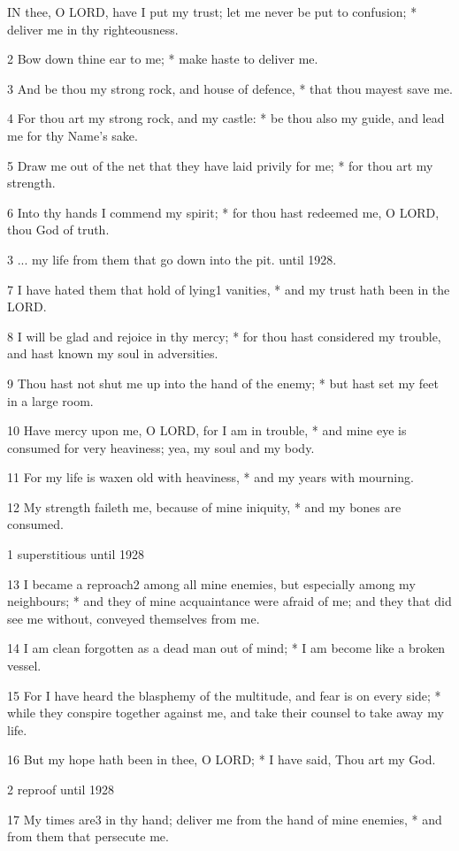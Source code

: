 IN
thee, O LORD, have I put my trust; let me never
be put to confusion; * deliver me in thy righteousness.

2 Bow down thine ear to me; * make haste to deliver
me.

3 And be thou my strong rock, and house of defence,
* that thou mayest save me.

4 For thou art my strong rock, and my castle: * be
thou also my guide, and lead me for thy Name's sake.

5 Draw me out of the net that they have laid privily
for me; * for thou art my strength.

6 Into thy hands I commend my spirit; * for thou hast
redeemed me, O LORD, thou God of truth.

3 ... my life from them that
go down into the pit. until
1928.

7 I have hated them that hold of lying1 vanities, * and
my trust hath been in the LORD.

8 I will be glad and rejoice in thy mercy; * for thou
hast considered my trouble, and hast known my soul in adversities.

9 Thou hast not shut me up into the hand of the enemy;
* but hast set my feet in a large room.

10 Have mercy upon me, O LORD,
for I am in trouble, * and mine eye is consumed for very heaviness; yea,
my soul and my body.

11 For my life is waxen old with heaviness, * and my
years with mourning.

12 My strength faileth me, because of mine iniquity,
* and my bones are consumed.

1 superstitious until
1928

13 I became a reproach2 among all mine enemies,
but especially among my neighbours; * and they of mine acquaintance were
afraid of me; and they that did see me without, conveyed themselves from
me.

14 I am clean forgotten as a dead man out of mind; *
I am become like a broken vessel.

15 For I have heard the blasphemy of the multitude, and
fear is on every side; * while they conspire together against me, and take
their counsel to take away my life.

16 But my hope hath been in thee, O LORD;
* I have said, Thou art my God.

2 reproof until
1928

17 My times are3 in thy hand; deliver me from
the hand of mine enemies, * and from them that persecute me.

